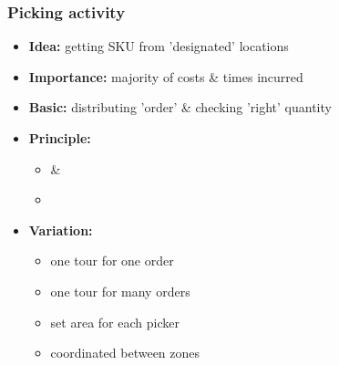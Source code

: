 \documentclass[10pt,handout,notes=show]{beamer}
\begin{document}
\begin{frame}
  \frametitle{Picking activity}

    \begin{itemize}
      \item \textbf{Idea:} getting SKU from 'designated' locations
      \item \textbf{Importance:} majority of \alert{costs \& times} incurred
      \item \textbf{Basic:} distributing 'order' \& checking 'right' quantity
      \item \textbf{Principle:}
      \begin{itemize}
        \item<1-|handout:1>  \& 
        \item<1-|handout:1> 
      \end{itemize}
      \item \textbf{Variation:}
      \begin{itemize}
        \item {}  one tour for one order
        \item {} one tour for many orders
        \item {} set area for each picker
        \item {} coordinated between zones \NextHalfLine
      \end{itemize}
    \end{itemize}


\end{frame}
\end{document}

